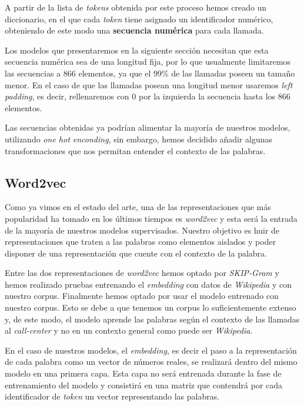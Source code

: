 A partir de la lista de \textit{tokens} obtenida por este proceso hemos creado un diccionario, en el que cada \textit{token} tiene asignado un identificador numérico, obteniendo de este modo una \textbf{secuencia numérica} para cada llamada. 

Los modelos que presentaremos en la siguiente sección necesitan que esta secuencia numérica sea de una longitud fija, por lo que usualmente limitaremos las secuencias a 866 elementos, ya que el 99\% de las llamadas poseen un tamaño menor. En el caso de  que las llamadas posean una longitud menor usaremos \textit{left padding}, es decir, rellenaremos con 0 por la izquierda la secuencia hasta los 866 elementos.


Las secuencias obtenidas ya podrían alimentar la mayoría de nuestros modelos, utilizando \textit{one hot enconding}, sin embargo, hemos decidido añadir algunas transformaciones que nos permitan entender el contexto de las palabras.  

\subsection{Word2vec}
Como ya vimos en el estado del arte, una de las representaciones que más popularidad ha tomado  en los últimos tiempos es \textit{word2vec} y esta será la entrada de la mayoría de nuestros modelos supervisados. Nuestro objetivo es huir de representaciones que traten a las palabras como elementos aislados y poder disponer de una representación que cuente con el contexto de la palabra.

Entre las dos representaciones de \textit{word2vec} hemos optado por \textit{SKIP-Gram} y hemos realizado pruebas entrenando el \textit{embedding} con datos de \textit{Wikipedia} y con nuestro corpus. Finalmente hemos optado por usar el modelo entrenado con nuestro corpus. Esto se debe a que tenemos un corpus lo suficientemente extenso y, de este modo, el modelo aprende las palabras según el contexto de las llamadas al \textit{call-center} y no en un contexto general como puede ser \textit{Wikipedia}.

En el caso de nuestros modelos, el \textit{embedding}, es decir el paso a la representación de cada palabra como un vector de números reales, se realizará dentro del mismo modelo en una primera capa. Esta capa no será entrenada durante la fase de entrenamiento del modelo y consistirá en una matriz que contendrá por cada identificador de \textit{token} un vector representando las palabras. 



